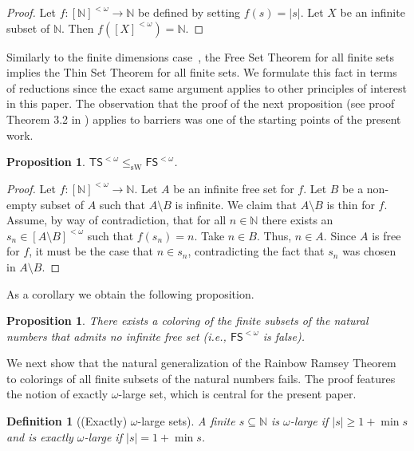 \documentclass[10pt,a4paper]{article}
\newcommand{\FS}[0]{\mathsf{FS}}
\newcommand{\TS}[0]{\mathsf{TS}}
\newcommand{\NN}[0]{\mathbb{N}}
\newcommand{\sW}{\mathrm{sW}}
\numberwithin{theorem}{section}
\newtheorem{proposition}[theorem]{Proposition}
\newtheorem{definition}[theorem]{Definition}
\begin{document}
\begin{proof}
Let $f:[\NN]^{<\omega} \to \NN$ be defined by setting $f(s) = |s|$. 
Let $X$ be an infinite subset of $\NN$. Then $f([X]^{<\omega})= \NN$.
\end{proof}


Similarly to the finite dimensions case~\cite{Cholak_Giusto_Hirst_Jockusch_2005}, the Free Set Theorem for all finite sets implies the Thin Set Theorem for all finite sets. 
We formulate this fact in terms of reductions since the exact same argument applies to other principles of interest in this paper. The observation that the proof of the next proposition (see proof Theorem 3.2 in \cite{Cholak_Giusto_Hirst_Jockusch_2005}) applies to barriers was one of the starting points of the present work. 

\begin{proposition}\label{prop:ts_red_fs}
$\TS^{<\omega}\leq_{\sW} \FS^{<\omega} $.
\end{proposition}

\begin{proof}
Let $f:[\NN]^{<\omega}\to \NN$. Let $A$ be an infinite free set for $f$. 
Let $B$ be a non-empty subset of $A$ such that $A\setminus B$ is infinite. 
We claim that $A\setminus B$ is thin for $f$. Assume, by way of contradiction, that for all $n \in \NN$ there exists an $s_n\in [A\setminus B]^{<\omega}$ such that $f(s_n) = n$. Take $n\in B$. Thus, $n \in A$. Since $A$ is free for $f$, it must be the case that $n \in s_n$, contradicting the fact that $s_n$ was chosen 
in $A\setminus B$. 
\end{proof}

As a corollary we obtain the following proposition. 

\begin{proposition}
There exists a coloring of the finite subsets of the natural numbers that admits no infinite free set (i.e., $\FS^{<\omega}$ is false). 
\end{proposition}

We next show that the natural generalization of the Rainbow Ramsey Theorem to colorings of all finite subsets of the natural numbers fails.
The proof features the notion of exactly $\omega$-large set, which is central for the present paper. 

\begin{definition}[(Exactly) $\omega$-large sets] 
A finite $s\subseteq \NN$ is $\omega$-large if $|s| \geq 1+\min s$ and is exactly $\omega$-large if $|s| = 1+\min s$.
\end{definition}
\end{document}
